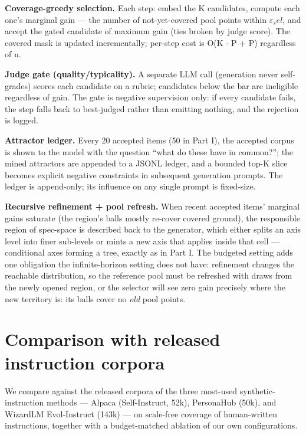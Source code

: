 \documentclass[11pt]{article}
\theoremstyle{plain}
\theoremstyle{definition}
\begin{document}
\textbf{Coverage-greedy selection.} Each step: embed the K candidates, compute each one's marginal gain --- the number of not-yet-covered pool points within $\varepsilon _sel$, and accept the gated candidate of maximum gain (ties broken by judge score). The covered mask is updated incrementally; per-step cost is O(K $\cdot$ P + P) regardless of n.

\textbf{Judge gate (quality/typicality).} A separate LLM call (generation never self-grades) scores each candidate on a rubric; candidates below the bar are ineligible regardless of gain. The gate is negative supervision only: if every candidate fails, the step falls back to best-judged rather than emitting nothing, and the rejection is logged.

\textbf{Attractor ledger.} Every 20 accepted items (50 in Part I), the accepted corpus is shown to the model with the question ``what do these have in common?''; the mined attractors are appended to a JSONL ledger, and a bounded top-K slice becomes explicit negative constraints in subsequent generation prompts. The ledger is append-only; its influence on any single prompt is fixed-size.

\textbf{Recursive refinement + pool refresh.} When recent accepted items' marginal gains saturate (the region's balls mostly re-cover covered ground), the responsible region of spec-space is described back to the generator, which either splits an axis level into finer sub-levels or mints a new axis that applies inside that cell --- conditional axes forming a tree, exactly as in Part I. The budgeted setting adds one obligation the infinite-horizon setting does not have: refinement changes the reachable distribution, so the reference pool must be refreshed with draws from the newly opened region, or the selector will see zero gain precisely where the new territory is: its balls cover no \emph{old} pool points.

\section{Comparison with released instruction corpora}
We compare against the released corpora of the three most-used synthetic-instruction methods --- Alpaca (Self-Instruct, 52k), PersonaHub (50k), and WizardLM Evol-Instruct (143k) --- on scale-free coverage of human-written instructions, together with a budget-matched ablation of our own configurations.
\end{document}
